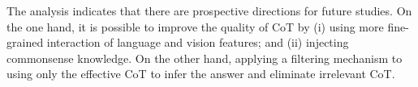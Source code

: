 \documentclass[nohyperref]{article}
\theoremstyle{plain}
\theoremstyle{definition}
\theoremstyle{remark}
\begin{document}
The analysis indicates that there are prospective directions for future studies. On the one hand, it is possible to improve the quality of CoT by (i) using more fine-grained interaction of language and vision features; and (ii) injecting commonsense knowledge. On the other hand, applying a filtering mechanism to using only the effective CoT to infer the answer and eliminate irrelevant CoT.
\end{document}
